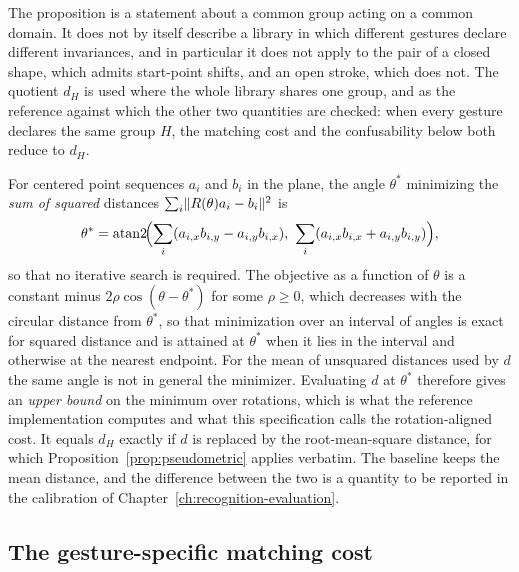The proposition is a statement about a common group acting on a common domain. It does not by itself describe a library in which different gestures declare different invariances, and in particular it does not apply to the pair of a closed shape, which admits start-point shifts, and an open stroke, which does not. The quotient $d_H$ is used where the whole library shares one group, and as the reference against which the other two quantities are checked: when every gesture declares the same group $H$, the matching cost and the confusability below both reduce to $d_H$.

\begin{remark}
For centered point sequences $a_i$ and $b_i$ in the plane, the angle $\theta^\ast$ minimizing the \emph{sum of squared} distances $\sum_i\lVert R(\theta)a_i-b_i\rVert^2$ is
\[
\theta^\ast=\operatorname{atan2}\!\Bigl(\sum_i (a_{i,x}b_{i,y}-a_{i,y}b_{i,x}),\ \sum_i (a_{i,x}b_{i,x}+a_{i,y}b_{i,y})\Bigr),
\]
so that no iterative search is required.\evD{} The objective as a function of $\theta$ is a constant minus $2\rho\cos(\theta-\theta^\ast)$ for some $\rho\ge0$, which decreases with the circular distance from $\theta^\ast$, so that minimization over an interval of angles is exact for squared distance and is attained at $\theta^\ast$ when it lies in the interval and otherwise at the nearest endpoint. For the mean of unsquared distances used by $d$ the same angle is not in general the minimizer. Evaluating $d$ at $\theta^\ast$ therefore gives an \emph{upper bound} on the minimum over rotations, which is what the reference implementation computes and what this specification calls the rotation-aligned cost. It equals $d_H$ exactly if $d$ is replaced by the root-mean-square distance, for which Proposition~\ref{prop:pseudometric} applies verbatim. The baseline keeps the mean distance, and the difference between the two is a quantity to be reported in the calibration of Chapter~\ref{ch:recognition-evaluation}.
\end{remark}

\subsection*{The gesture-specific matching cost}

